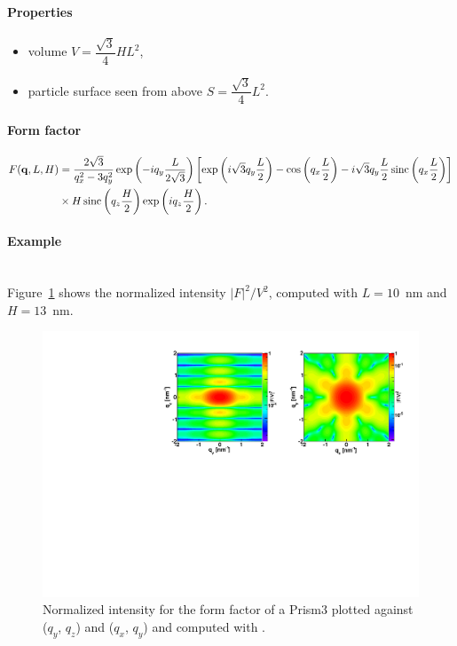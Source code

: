 \paragraph{Properties}
\begin{itemize}
\item volume $V= \dfrac{\sqrt{3}}{4} H L^2$,
\item particle surface seen from above $S =\dfrac{\sqrt{3}}{4}L^2$.

\end{itemize}

\paragraph{Form factor}
\begin{align*}
F(\mathbf{q},L, H) &= \frac{2 \sqrt{3}}{q_x^2-3q_y^2}  \exp\left(-i q_y\frac{L}{2\sqrt{3}}\right)\left[\exp\left(i \sqrt{3} q_y \frac{L}{2} \right)-\cos\left(q_x \frac{L}{2}\right)-i \sqrt{3} q_y \frac{L}{2} \operatorname{sinc}\left(q_x \frac{L}{2}\right) \right] \\
  &
\times  H \operatorname{sinc}\left(q_z \frac{H}{2} \right) \exp\left(i q_z \frac{H}{2}\right).
\end{align*}


\paragraph{Example}\strut\\
Figure~\ref{fig:FFprism3Ex} shows the normalized intensity
$|F|^2/V^2$, computed with $L=10$~nm and \mbox{$H=13$~nm.}
\begin{figure}[h]
\begin{center}
\includegraphics[angle=-90,width=\textwidth]{fig/ff/figffprism3.pdf}
\end{center}
\caption{Normalized intensity for the form factor of a Prism3
 plotted against ($q_y$, $q_z$) and  ($q_x$, $q_y$) and
  computed with .}
\label{fig:FFprism3Ex}
\end{figure}

